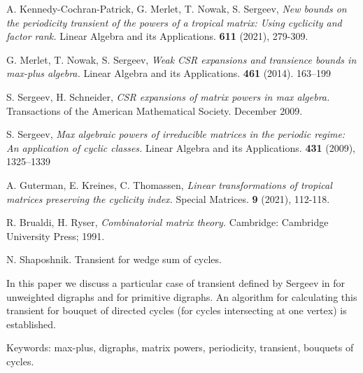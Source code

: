 \documentclass[12pt]{article}
\begin{document}
\begin{thebibliography}{9}
A. Kennedy-Cochran-Patrick, G. Merlet, T. Nowak, S. Sergeev,
\textit{New bounds on the periodicity transient of the powers of a tropical matrix: Using cyclicity and factor rank.}
Linear Algebra and its Applications. \textbf{611} (2021), 279-309.

G. Merlet, T. Nowak, S. Sergeev, \textit{Weak CSR expansions and transience bounds in max-plus algebra.}
Linear Algebra and its Applications. \textbf{461} (2014). 163–199

S. Sergeev, H. Schneider,
\textit{CSR expansions of matrix powers in max algebra.} Transactions of the American Mathematical Society. December 2009.

S. Sergeev, \textit{Max algebraic powers of irreducible matrices in the periodic regime: An application of cyclic classes.} Linear Algebra and its Applications. \textbf{431} (2009), 1325–1339

A. Guterman, E. Kreines, C. Thomassen,
\textit{Linear transformations of tropical matrices
preserving the cyclicity index.}
Special Matrices. \textbf{9} (2021), 112-118.

R. Brualdi, H. Ryser, \textit{Combinatorial matrix theory.} Cambridge: Cambridge University Press;
1991.

\end{thebibliography}

N. Shaposhnik. Transient for wedge sum of cycles.

In this paper we discuss a particular case of transient defined by Sergeev in \cite{maxAlgebraicPowers} for unweighted digraphs and for primitive digraphs. An algorithm for calculating this transient for bouquet of directed cycles (for cycles intersecting at one vertex) is established.

Keywords: max-plus, digraphs, matrix powers, periodicity, transient, bouquets of cycles.
\end{document}
